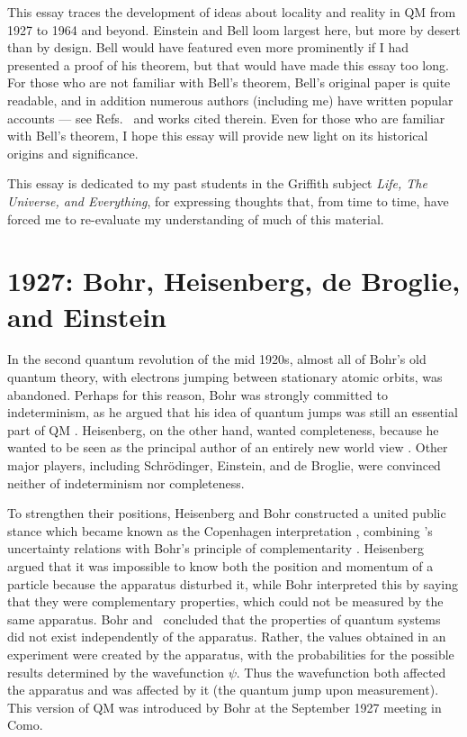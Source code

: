 \documentclass[12pt]{iopart}
\begin{document}
This essay traces the development of ideas about locality and reality in QM from 
1927 to 1964 and beyond. Einstein and Bell loom largest here, but more by desert than by design. 
Bell would have featured even more prominently if I had presented a proof of his theorem, but that 
would have made this essay too long. For those who are not familiar with Bell's theorem, 
Bell's original paper \cite{Bel64} is quite readable, and in addition 
numerous authors (including me) have written popular accounts --- see Refs.~\cite{Har98,JacWis05} and works cited therein. Even for those who are familiar with Bell's theorem, I hope this essay will provide new light on its historical origins and significance. 

This essay is dedicated to my past students in the Griffith subject  
{\em Life, The Universe, and Everything}, for expressing thoughts that,
from time to time, have forced me to re-evaluate  my understanding of much of this material.

\section{1927: Bohr, Heisenberg, de Broglie, and Einstein} \label{sec:BHDE}

In the second quantum revolution of the mid 1920s, almost all of Bohr's
old quantum theory, with electrons jumping between stationary atomic orbits,  
was abandoned. Perhaps for this reason, Bohr
was strongly committed to indeterminism, as he argued that
his idea of quantum jumps was still an essential part of 
QM \cite{Bel99}. Heisenberg, on the other hand, wanted completeness,
because he wanted to be seen as the principal author of an entirely
new world view \cite{Bel99}. Other major players, including
 Schr\"odinger, Einstein, and de Broglie, were convinced
 neither of indeterminism nor completeness.

 To strengthen their  positions, Heisenberg and Bohr constructed a united public
stance which became known as the Copenhagen
interpretation  \cite{Bel99}, combining \hei's uncertainty relations \cite{Hei27} with Bohr's principle
 of complementarity \cite{Boh28}. Heisenberg argued that it was impossible to know 
both the position and momentum of a particle because the apparatus disturbed it, 
while Bohr interpreted this by saying that they were complementary properties, 
 which could not be measured by the same apparatus. 
Bohr and \hei\  concluded that the properties of quantum systems did not exist independently of the apparatus. Rather, the values obtained in an experiment were created by the apparatus, with 
the  probabilities for the possible results determined by the wavefunction $\psi$. 
 Thus the wavefunction both affected the apparatus and was affected by it 
 (the quantum jump upon measurement). 
This version of QM was introduced 
 by Bohr at the September 1927 meeting in Como. 
 
\end{document}
